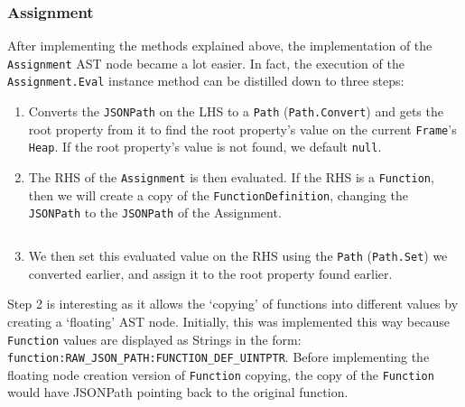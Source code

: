 \subsubsection{Assignment}

After implementing the methods explained above, the implementation of the \verb|Assignment| AST node became a lot easier. In fact, the execution of the \verb|Assignment.Eval| instance method can be distilled down to three steps:

\begin{enumerate}
    \item Converts the \verb|JSONPath| on the LHS to a \verb|Path| (\verb|Path.Convert|) and gets the root property from it to find the root property's value on the current \verb|Frame|'s \verb|Heap|. If the root property's value is not found, we default \verb|null|.
    \item The RHS of the \verb|Assignment| is then evaluated. If the RHS is a \verb|Function|, then we will create a copy of the \verb|FunctionDefinition|, changing the \verb|JSONPath| to the \verb|JSONPath| of the Assignment.
    \inputminted[firstline=205, lastline=218, autogobble, breaklines, tabsize=4]{go}{../../src/parser/eval.go}
    \item We then set this evaluated value on the RHS using the \verb|Path| (\verb|Path.Set|) we converted earlier, and assign it to the root property found earlier.
\end{enumerate}

Step 2 is interesting as it allows the `copying' of functions into different values by creating a `floating' AST node. Initially, this was implemented this way because \verb|Function| values are displayed as Strings in the form: \verb|function:RAW_JSON_PATH:FUNCTION_DEF_UINTPTR|. Before implementing the floating node creation version of \verb|Function| copying, the copy of the \verb|Function| would have JSONPath pointing back to the original function.
